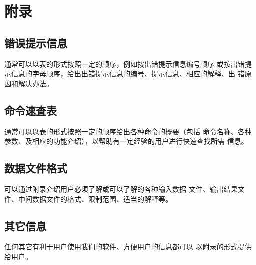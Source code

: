 \chapter{附录}
\section{错误提示信息}
通常可以以表的形式按照一定的顺序，例如按出错提示信息编号顺序
或按出错提示信息的字母顺序，给出出错提示信息的编号、提示信息、相应的解释、出
错原因和解决办法。
\section{命令速査表}
通常可以以表的形式按照一定的顺序给出各种命令的概要（包括
命令名称、各种参数、及相应的功能介绍），以帮助有一定经验的用户进行快速查找所需
信息。
\section{数据文件格式}
可以通过附录介绍用户必须了解或可以了解的各种输入数据
文件、输出结果文件、中间数据文件的格式、限制范围、适当的解释等。
\section{其它信息}
任何其它有利于用户使用我们的软件、方便用户的信息都可以
以附录的形式提供给用户。